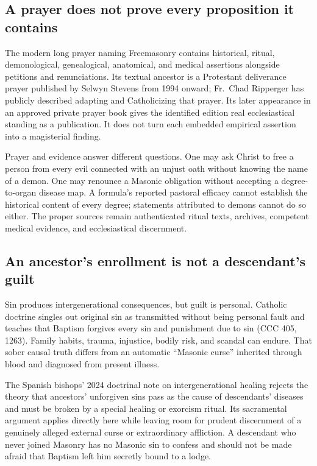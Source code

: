 \subsection{A prayer does not prove every proposition it contains}

The modern long prayer naming Freemasonry contains historical, ritual, demonological, genealogical, anatomical, and medical assertions alongside petitions and renunciations. Its textual ancestor is a Protestant deliverance prayer published by Selwyn Stevens from 1994 onward; Fr.~Chad Ripperger has publicly described adapting and Catholicizing that prayer. Its later appearance in an approved private prayer book gives the identified edition real ecclesiastical standing as a publication. It does not turn each embedded empirical assertion into a magisterial finding.

Prayer and evidence answer different questions. One may ask Christ to free a person from every evil connected with an unjust oath without knowing the name of a demon. One may renounce a Masonic obligation without accepting a degree-to-organ disease map. A formula's reported pastoral efficacy cannot establish the historical content of every degree; statements attributed to demons cannot do so either. The proper sources remain authenticated ritual texts, archives, competent medical evidence, and ecclesiastical discernment.

\subsection{An ancestor's enrollment is not a descendant's guilt}

Sin produces intergenerational consequences, but guilt is personal. Catholic doctrine singles out original sin as transmitted without being personal fault and teaches that Baptism forgives every sin and punishment due to sin (CCC 405, 1263). Family habits, trauma, injustice, bodily risk, and scandal can endure. That sober causal truth differs from an automatic “Masonic curse” inherited through blood and diagnosed from present illness.

The Spanish bishops' 2024 doctrinal note on intergenerational healing rejects the theory that ancestors' unforgiven sins pass as the cause of descendants' diseases and must be broken by a special healing or exorcism ritual. Its sacramental argument applies directly here while leaving room for prudent discernment of a genuinely alleged external curse or extraordinary affliction. A descendant who never joined Masonry has no Masonic sin to confess and should not be made afraid that Baptism left him secretly bound to a lodge.

